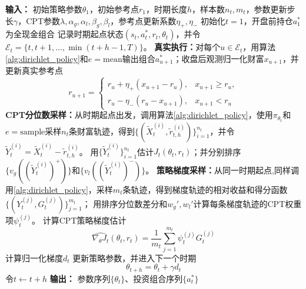 \documentclass{sufethesismas}
\begin{document}
\begin{algorithm}[H]
\caption{基于动态参考点的CPT-PG在线优化器}
\label{alg:drcpt_pg}
\begin{algorithmic}[1]
\STATE \textbf{输入：} 初始策略参数$\theta_1$，初始参考点$r_1$，时期长度$h$，样本数$n_t,m_t$，参数更新步长$\gamma$，CPT参数$\lambda,\alpha_g,\alpha_l,\beta_g,\beta_l$，参考点更新系数$\eta_+,\eta_-$
\STATE 初始化$t=1$，开盘前持仓$a_1^*$为全现金组合
    \STATE 记录时期起点状态$(s_t,a_t^*,r_t,\theta_t)$，并令$\mathcal{E}_t=\{t,t+1,\ldots,\min(t+h-1,T)\}$。
    \STATE \textbf{真实执行：}对每个$u\in\mathcal{E}_t$，用算法\ref{alg:dirichlet_policy}和$e=\mathrm{mean}$输出组合$a_{u+1}^*$；收盘后观测归一化财富$x_{u+1}$，并更新真实参考点
    \begin{equation*}
    r_{u+1}
    =
    \begin{cases}
    r_u+\eta_+\left(x_{u+1}-r_u\right), & x_{u+1}\ge r_u,\\[4pt]
    r_u-\eta_-\left(r_u-x_{u+1}\right), & x_{u+1}<r_u
    \end{cases}
    \end{equation*}
    \STATE \textbf{CPT分位数采样：}从时期起点出发，调用算法\ref{alg:dirichlet_policy}，使用$\pi_{\theta_t}$和$e=\mathrm{sample}$采样$n_t$条财富轨迹，得到$\{(\widetilde X_t^{(i)},\widetilde r_{t,h}^{(i)})\}_{i=1}^{n_t}$，并令$\widetilde Y_t^{(i)}=\widetilde X_t^{(i)}-\widetilde r_{t,h}^{(i)}$。
    \STATE 用$\{\widetilde Y_t^{(i)}\}_{i=1}^{n_t}$估计$J_t(\theta_t,r_t)$；并分别排序$\{v_g((\widetilde Y_t^{(i)})^+)\}$和$\{v_l((\widetilde Y_t^{(i)})^-)\}$。
    \STATE \textbf{策略梯度采样：}从同一时期起点,同样调用\ref{alg:dirichlet_policy}，采样$m_t$条轨迹，得到梯度轨迹的相对收益和得分函数$\{(Y_t^{(j)},G_t^{(j)})\}_{j=1}^{m_t}$；
    \STATE 用排序分位数差分和$w_g',w_l'$计算每条梯度轨迹的CPT权重项$\psi_t^{(j)}$。
    \STATE 计算CPT策略梯度估计
    \begin{equation*}
    \widehat{\nabla_\theta J_t}(\theta_{t},r_t)
    =
    \frac{1}{m_t}
    \sum_{j=1}^{m_t}
    \psi_t^{(j)}
    G_t^{(j)}
    \end{equation*}
    \STATE 计算归一化梯度$d_t$
    \STATE 更新策略参数，并进入下一个时期
    \begin{equation*}
    \theta_{t+h}
    =
    \theta_t+\gamma d_t
    \end{equation*}
    \STATE 令$t\leftarrow t+h$
\ENDWHILE
\STATE \textbf{输出：} 参数序列$\{\theta_t\}$、投资组合序列$\{a_t^*\}$
\end{algorithmic}
\end{algorithm}
\end{document}

